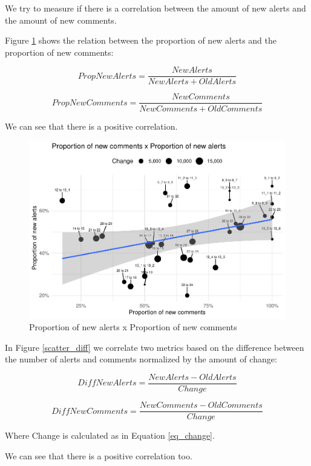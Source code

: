 \documentclass[
]{article}
\begin{document}
\normalsize

\newpage

We try to measure if there is a correlation between the amount of new
alerts and the amount of new comments.

Figure \ref{scatter_prop} shows the relation between the proportion of
new alerts and the proportion of new comments:

\[PropNewAlerts = \frac{NewAlerts}{NewAlerts + OldAlerts}\]

\[PropNewComments = \frac{NewComments}{NewComments + OldComments}\]

We can see that there is a positive correlation.

\small

\begin{figure}
\centering
\includegraphics{report_files/figure-latex/unnamed-chunk-20-1.pdf}
\caption{\label{scatter_prop}Proportion of new alerts x Proportion of
new comments}
\end{figure}

\normalsize

In Figure \ref{scatter_diff} we correlate two metrics based on the
difference between the number of alerts and comments normalized by the
amount of change:

\[DiffNewAlerts = \frac{NewAlerts - OldAlerts}{Change}\]

\[DiffNewComments = \frac{NewComments - OldComments}{Change}\]

Where Change is calculated as in Equation \ref{eq_change}.

We can see that there is a positive correlation too.

\small
\end{document}
